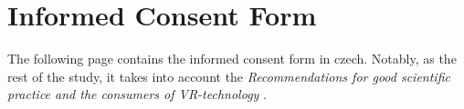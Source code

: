 \chapter{Informed Consent Form}\label{appendix:informed-consent}
The following page contains the informed consent form in czech.
Notably, as the rest of the study, it takes into account the \textit{Recommendations for good scientific practice and the consumers of VR-technology} \autocite{madary2016real}.


